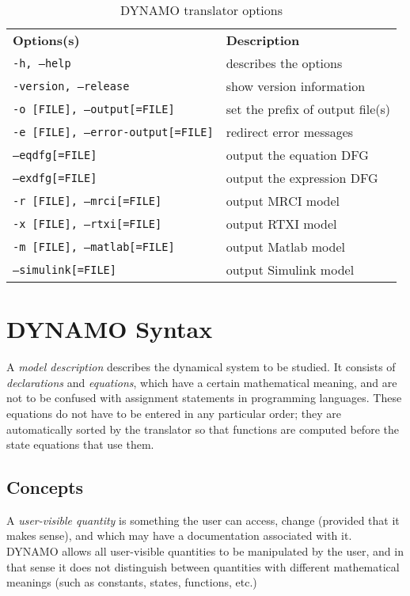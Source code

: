 \begin{table}[htdp]
\caption{DYNAMO translator options}
\begin{center}
\vspace{.5cm}
\begin{tabular}{ll}
\textbf{Options(s)} & \textbf{Description}\\
\texttt{-h,  --help} & describes the options\\
\texttt{-version, --release} & show version information\\
\texttt{-o [FILE],  --output[=FILE]} & set the prefix of output file(s)\\
\texttt{-e [FILE],  --error-output[=FILE]} & redirect error messages\\
\texttt{--eqdfg[=FILE]} & output the equation DFG\\
\texttt{--exdfg[=FILE]} & output the expression DFG\\
\texttt{-r [FILE],  --mrci[=FILE]} & output MRCI model\\
\texttt{-x [FILE],  --rtxi[=FILE]} & output RTXI model\\
\texttt{-m [FILE],  --matlab[=FILE]} & output Matlab model\\
\texttt{--simulink[=FILE]} & output Simulink model\\
\end{tabular}
\end{center}
\label{default}
\end{table}%

\section{DYNAMO Syntax}

A \emph{model description} describes the dynamical system to be
studied. It consists of \emph{declarations} and \emph{equations}, which
have a certain mathematical meaning, and are not to be confused with
assignment statements in programming languages. These equations do not
have to be entered in any particular order; they are automatically
sorted by the translator so that functions are computed before the
state equations that use them.

\subsection{Concepts}

A \emph{user-visible quantity} is something the user can access, change
(provided that it makes sense), and which may have a documentation
associated with it. DYNAMO allows all user-visible quantities to be
manipulated by the user, and in that sense it does not distinguish
between quantities with different mathematical meanings (such as
constants, states, functions, etc.)

